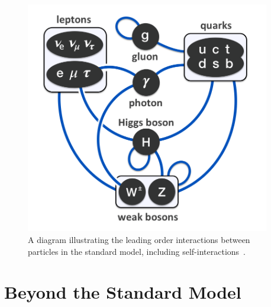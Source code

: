 \begin{figure}[hbt]
	\begin{center}
		\includegraphics[width=0.95\textwidth]{figures/Chapter2/Elementary_particle_interactions_in_the_Standard_Model.png}
		\caption{A diagram illustrating the leading order interactions between particles in the standard model, including self-interactions~\cite{Drexler}.}
		\label{fig:sm-interactions}
	\end{center}
\end{figure}


\section{Beyond the Standard Model}
\label{sec:BSM}